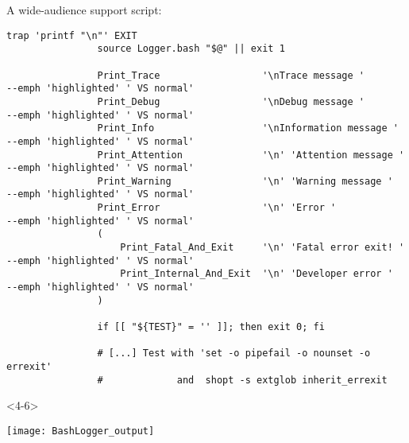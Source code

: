 \begin{frame}[fragile]{A wide-audience support script: }
\begin{overlayarea}{\textwidth}{0.8\textheight}
\begin{onlyenv}
\begin{lstlisting}[style=myBash, aboveskip=0mm, numbers=none, style=smaller, xleftmargin=-1mm, xrightmargin=-1mm]
                trap 'printf "\n"' EXIT
                source Logger.bash "$@" || exit 1

                Print_Trace                  '\nTrace message '         --emph 'highlighted' ' VS normal'
                Print_Debug                  '\nDebug message '         --emph 'highlighted' ' VS normal'
                Print_Info                   '\nInformation message '   --emph 'highlighted' ' VS normal'
                Print_Attention              '\n' 'Attention message '  --emph 'highlighted' ' VS normal'
                Print_Warning                '\n' 'Warning message '    --emph 'highlighted' ' VS normal'
                Print_Error                  '\n' 'Error '              --emph 'highlighted' ' VS normal'
                (
                    Print_Fatal_And_Exit     '\n' 'Fatal error exit! '  --emph 'highlighted' ' VS normal'
                    Print_Internal_And_Exit  '\n' 'Developer error '    --emph 'highlighted' ' VS normal'
                )

                if [[ "${TEST}" = '' ]]; then exit 0; fi

                # [...] Test with 'set -o pipefail -o nounset -o errexit'
                #             and  shopt -s extglob inherit_errexit
            \end{lstlisting}
        \end{onlyenv}
        \begin{onlyenv}<4-6>
            \vspace{-4mm}
            \begin{center}
                \texttt{[image: BashLogger\_output]}\\[-1pt]
                \\[-1pt]
            \end{center}
        \end{onlyenv}
    \end{overlayarea}
\end{frame}

